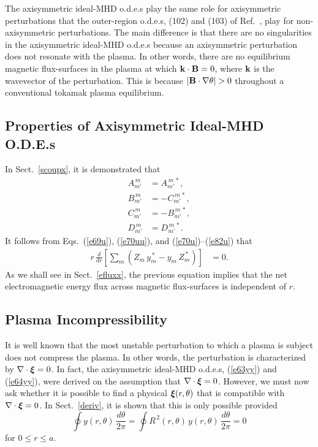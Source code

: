 \documentclass[12pt,prb,aps]{revtex4-1}
\newcommand {\bxi}{\mbox{\boldmath$\xi$}}
\begin{document}
The axisymmetric ideal-MHD o.d.e.s play the same role for axisymmetric perturbations that the outer-region o.d.e.s, (102) and (103) of Ref.~, play for
non-axisymmetric perturbations. The main difference is that there are no singularities in the axisymmetric ideal-MHD o.d.e.s because an axisymmetric perturbation 
does not resonate with the plasma. In other words, there are no equilibrium magnetic flux-surfaces in the plasma at which ${\bf k}\cdot{\bf B}=0$, where ${\bf k}$ is the
wavevector of the perturbation. This is because $|{\bf B}\cdot\nabla\theta|>0$ throughout a conventional tokamak plasma equilibrium. 

\subsection{Properties of Axisymmetric Ideal-MHD O.D.E.s}
In Sect.~\ref{scoupx}, it is demonstrated that 
\begin{align}\label{e70u}
A_{m'}^{\,m} &= A_{m'}^{\,m\,\ast},\\[0.5ex]
B_{m'}^{\,m} &= -C_{m'}^{\,m\,\ast},\\[0.5ex]
C_{m'}^{\,m} &= -B_{m'}^{\,m\,\ast},\\[0.5ex]
D_{m'}^{\,m} &= D_{m'}^{\,m\,\ast}.\label{e82u}
\end{align}
It follows from Eqs.~(\ref{e69u}), (\ref{e70uu}), and (\ref{e70u})--(\ref{e82u}) that 
\begin{align}\label{cons}
r\,\frac{d}{dr}\!\left[\sum_m (Z_m\,y_m^{\,\ast}- y_m\,Z_m^{\,\ast}) \right]&= 0.
\end{align}
As we shall see in Sect.~\ref{efluxx}, the previous equation implies that the net electromagnetic energy flux across magnetic flux-surfaces is independent of $r$. 

\subsection{Plasma Incompressibility}\label{incomp}
It is well known that the most unstable perturbation to which a plasma is subject does not compress the plasma. In other words,
the perturbation is characterized by $\nabla\cdot\bxi=0$.\cite{gs1} In fact, the axisymmetric ideal-MHD o.d.e.s, (\ref{e63yy}) and (\ref{e64yy}), were derived
on the assumption that $\nabla\cdot \bxi=0$. However, we must now ask whether it is possible to find a physical $\bxi(r,\theta)$ that is compatible
with $\nabla\cdot \bxi=0$. In Sect.~\ref{deriv}, it is shown that this is only possible provided 
\begin{equation}\label{eghj}
\oint y(r,\theta)\,\frac{d\theta}{2\pi}= \oint R^{\,2}(r,\theta)\,y(r,\theta)\,\frac{d\theta}{2\pi}=0
\end{equation}
for $0\leq r\leq a$. 
\end{document}

